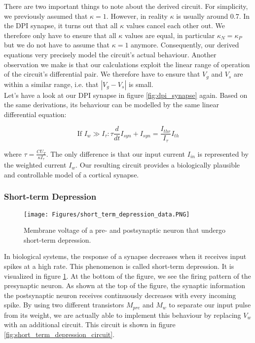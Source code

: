 There are two important things to note about the derived circuit. For simplicity, we previously assumed that $\kappa = 1$. However, in reality $\kappa$ is usually around $0.7$. In the DPI synapse, it turns out that all $\kappa$ values cancel each other out. We therefore only have to ensure that all $\kappa$ values are equal, in particular $\kappa_N = \kappa_P$ but we do not have to assume that $\kappa = 1$ anymore. Consequently, our derived equations very precisely model the circuit's actual behaviour. Another observation we make is that our calculations exploit the linear range of operation of the circuit's differential pair. We therefore have to ensure that $V_g$ and $V_s$ are within a similar range, i.e. that $|V_g - V_s|$ is small.\\

Let's have a look at our DPI synapse in figure \ref{fig:dpi_synapse} again. Based on the same derivations, its behaviour can be modelled by the same linear differential equation:

\begin{equation}
    \text{If $I_w \gg I_{\tau}$}: \tau \frac{d}{dt} I_{syn} + I_{syn} = \frac{I_{thr}}{I_{\tau}} I_{th}
\end{equation}

where $\tau = \frac{C U_T}{\kappa I_{\tau}}$. The only difference is that our input current $I_{in}$ is represented by the weighted current $I_w$. Our resulting circuit provides a biologically plausible and controllable model of a cortical synapse.

\subsubsection{Short-term Depression}\label{sec:short_term_depression}

\begin{figure}
    \centering
    \texttt{[image: Figures/short\_term\_depression\_data.PNG]}
    \caption{Membrane voltage of a pre- and postsynaptic neuron that undergo short-term depression.}
    \label{fig:short_term_depression_data}
\end{figure}

In biological systems, the response of a synapse decreases when it receives input spikes at a high rate. This phenomenon is called short-term depression. It is visualized in figure \ref{fig:short_term_depression_data}. At the bottom of the figure, we see the firing pattern of the presynaptic neuron. As shown at the top of the figure, the synaptic information the postsynaptic neuron receives continuously decreases with every incoming spike.  By using two different transistors $M_{pre}$ and $M_w$ to separate our input pulse from its weight, we are actually able to implement this behaviour by replacing $V_w$ with an additional circuit. This circuit is shown in figure \ref{fig:short_term_depression_circuit}.\\

